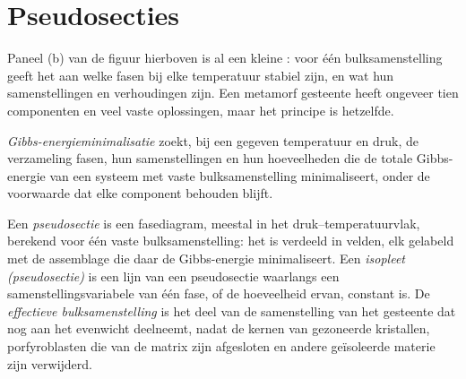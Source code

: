\section{Pseudosecties}\label{sec:b3:petrological-thermodynamics:pseudosections}

Paneel (b) van de figuur hierboven is al een kleine : voor één
bulksamenstelling geeft het aan welke fasen bij elke temperatuur stabiel zijn, en wat
hun samenstellingen en verhoudingen zijn. Een metamorf gesteente heeft ongeveer tien
componenten en veel vaste oplossingen, maar het principe is hetzelfde.

\begin{definition}\label{def:b3:petrological-thermodynamics:minimisation}
\emph{Gibbs-energieminimalisatie} zoekt, bij een
gegeven temperatuur en druk, de verzameling fasen, hun samenstellingen en
hun hoeveelheden die de totale Gibbs-energie van een systeem met vaste
bulksamenstelling minimaliseert, onder de voorwaarde dat elke component behouden blijft.
\end{definition}

\begin{definition}\label{def:b3:petrological-thermodynamics:pseudosection}
Een \emph{pseudosectie} is een fasediagram, meestal in
het druk--temperatuurvlak, berekend voor één vaste bulksamenstelling: het
is verdeeld in velden, elk gelabeld met de assemblage die daar de Gibbs-energie minimaliseert. Een
\emph{isopleet (pseudosectie)}
is een lijn van een pseudosectie waarlangs een samenstellingsvariabele van één fase, of
de hoeveelheid ervan, constant is. De \emph{effectieve
bulksamenstelling} is het deel van de
samenstelling van het gesteente dat nog aan het evenwicht deelneemt, nadat de kernen van gezoneerde
kristallen, porfyroblasten die van de matrix zijn afgesloten en andere
geïsoleerde materie zijn verwijderd.
\end{definition}

